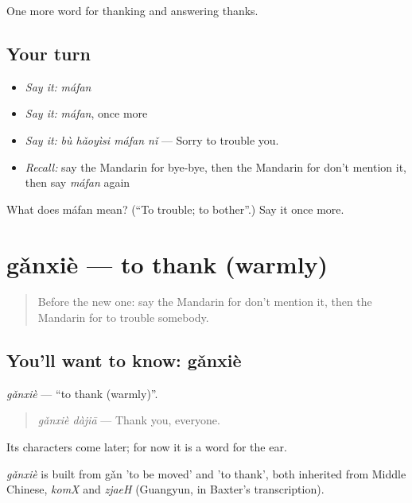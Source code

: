 \begin{grammarlens}[title={What you've built}]
One more word for thanking and answering thanks.
\end{grammarlens}

\subsection*{Your turn}
\begin{itemize}
\raggedright
  \item \emph{Say it:} \emph{máfan}
  \item \emph{Say it:} \emph{máfan}, once more
  \item \emph{Say it:} \emph{bù hǎoyìsi máfan nǐ} — Sorry to trouble you.
  \item \emph{Recall:} say the Mandarin for bye-bye, then the Mandarin for don't mention it, then say \emph{máfan} again
\end{itemize}

\begin{tcolorbox}[breakable,colback=teal!4,colframe=teal!35!black,title={Before you move on}]
What does máfan mean? (\textquotedblleft{}To trouble; to bother\textquotedblright{}.) Say it once more.
\end{tcolorbox}
\section[gǎnxiè]{gǎnxiè — to thank (warmly)}

\label{lesson:ZH-C77-ganxie}



\begin{quote}
Before the new one: say the Mandarin for don't mention it, then the Mandarin for to trouble somebody.
\end{quote}

\subsection*{You'll want to know: gǎnxiè}
\emph{gǎnxiè} — \textquotedblleft{}to thank (warmly)\textquotedblright{}.

\begin{quote}
\emph{gǎnxiè dàjiā} — Thank you, everyone.
\end{quote}

Its characters come later; for now it is a word for the ear.

\begin{cousinweb}
\emph{gǎnxiè} is built from gǎn 'to be moved' and  'to thank', both inherited from Middle Chinese, \emph{komX} and \emph{zjaeH} (Guangyun, in Baxter's transcription).
\end{cousinweb}

